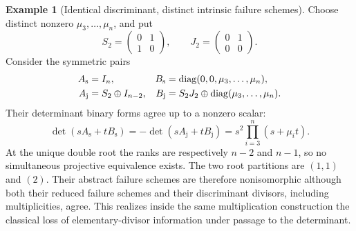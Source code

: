 \documentclass[11pt,reqno]{amsart}
\numberwithin{equation}{section}
\theoremstyle{definition}\newtheorem{definition}[theorem]{Definition}
\newtheorem{example}[theorem]{Example}
\theoremstyle{remark}\newtheorem{remark}[theorem]{Remark}
\begin{document}
\begin{example}[Identical discriminant, distinct intrinsic failure schemes]
\label{ex:same-discriminant-distinct-failure}
Choose distinct nonzero \(\mu_3,\ldots,\mu_n\), and put
\[
 S_2=\begin{pmatrix}0&1\\1&0\end{pmatrix},\qquad
 J_2=\begin{pmatrix}0&1\\0&0\end{pmatrix}.
\]
Consider the symmetric pairs
\begin{align*}
 A_{\mathrm{s}}&=I_n,&
 B_{\mathrm{s}}&=\operatorname{diag}(0,0,\mu_3,\ldots,\mu_n),\\
 A_{\mathrm{j}}&=S_2\oplus I_{n-2},&
 B_{\mathrm{j}}&=S_2J_2\oplus\operatorname{diag}(\mu_3,\ldots,\mu_n).
\end{align*}
Their determinant binary forms agree up to a nonzero scalar:
\begin{equation}\label{eq:same-discriminant-pencils}
 \det(sA_{\mathrm{s}}+tB_{\mathrm{s}})
 =-\det(sA_{\mathrm{j}}+tB_{\mathrm{j}})
 =s^2\prod_{i=3}^n(s+\mu_i t).
\end{equation}
At the unique double root the ranks are respectively \(n-2\)
and \(n-1\), so no simultaneous projective equivalence exists.
The two root partitions are \((1,1)\) and \((2)\).
Their abstract failure schemes are therefore nonisomorphic although
both their reduced failure schemes and their discriminant divisors,
including multiplicities, agree.  This realizes inside the same
multiplication construction the classical loss of elementary-divisor
information under passage to the determinant.
\end{example}
\end{document}
